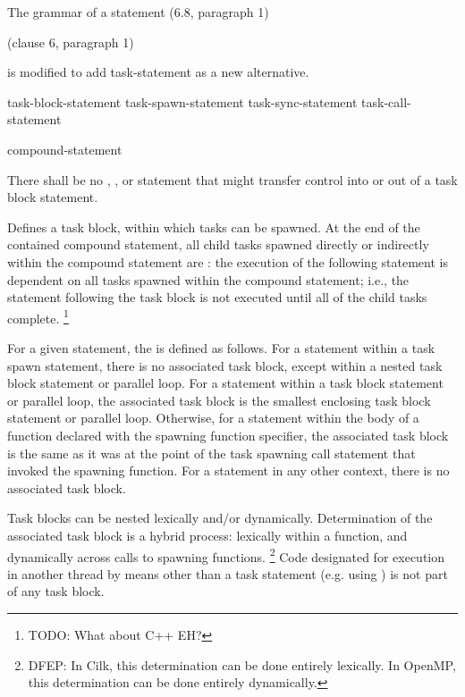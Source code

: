 
\pnum
The grammar of a statement (6.8, paragraph 1)
\begin{cpp}
(clause 6, paragraph 1)
\end{cpp}
is modified to add task-statement as a new alternative.


\begin{bnf}
\br
task-block-statement
\br
task-spawn-statement
\br
task-sync-statement
\br
task-call-statement
\end{bnf}


\begin{bnf}
\br
{}  compound-statement
\end{bnf}


\pnum
There shall be no
,
,
or
statement that might transfer control into or out of
a task block statement.


\pnum
Defines a task block, within which tasks can be spawned.
At the end of the contained compound statement,
all child tasks spawned directly or indirectly
within the compound statement are
:
the execution of the following statement is dependent
on all tasks spawned within the compound statement; i.e.,
the statement following the task block is not executed
until all of the child tasks complete.
\footnote{TODO:
What about C++ EH?
}

\pnum
For a given statement, the
is defined as follows.
For a statement within a task spawn statement,
there is no associated task block,
except within a nested task block statement
or parallel loop.
For a statement within a task block statement
or parallel loop,
the associated task block is the smallest enclosing task block statement
or parallel loop.
Otherwise, for a statement within the body of a function
declared with the spawning function specifier,
the associated task block is the same as it was
at the point of the task spawning call statement
that invoked the spawning function.
For a statement in any other context,
there is no associated task block.

\begin{note}
Task blocks can be nested lexically and/or dynamically.
Determination of the associated task block is a hybrid process:
lexically within a function,
and dynamically across calls to spawning functions.%
\footnote{DFEP:
In Cilk, this determination can be done entirely lexically.
In OpenMP, this determination can be done entirely dynamically.
}
Code designated for execution in another thread
by means other than a task statement
(e.g. using
)
is not part of any task block.
\end{note}

